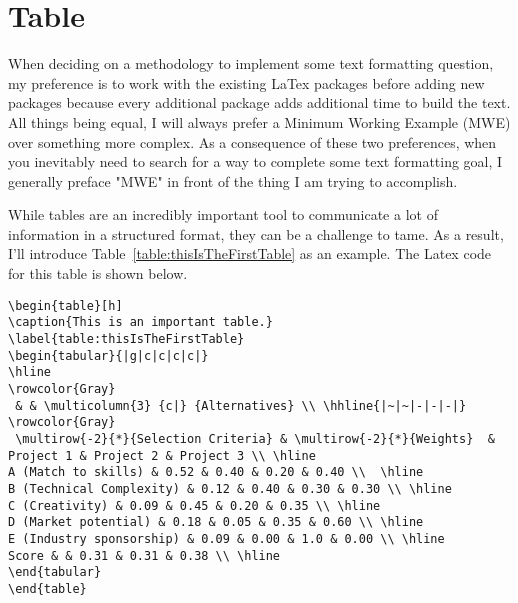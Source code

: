 \section{Table}
\label{section:the-first-section}
When deciding on a methodology to implement some text formatting question,
my preference is to work with the existing LaTex packages before adding new
packages because every additional package adds additional time to build the
text.  All things being equal, I will always prefer a Minimum Working Example 
(MWE) over something more complex.  As a consequence of these two preferences,
when you inevitably need to search for a way to complete some text formatting
goal, I generally preface "MWE" in front of the thing I am trying to accomplish.

While tables are an incredibly important tool to communicate a lot of information 
in a structured format, they can be a challenge to tame.  As a result, I'll introduce
Table~\ref{table:thisIsTheFirstTable} as an example.  The Latex code for this table
is shown below.


\begin{verbatim}
\begin{table}[h]
\caption{This is an important table.}
\label{table:thisIsTheFirstTable}
\begin{tabular}{|g|c|c|c|c|}
\hline
\rowcolor{Gray}
 & & \multicolumn{3} {c|} {Alternatives} \\ \hhline{|~|~|-|-|-|}
\rowcolor{Gray}
 \multirow{-2}{*}{Selection Criteria} & \multirow{-2}{*}{Weights}  & Project 1 & Project 2 & Project 3 \\ \hline
A (Match to skills) & 0.52 & 0.40 & 0.20 & 0.40 \\  \hline
B (Technical Complexity) & 0.12 & 0.40 & 0.30 & 0.30 \\ \hline
C (Creativity) & 0.09 & 0.45 & 0.20 & 0.35 \\ \hline
D (Market potential) & 0.18 & 0.05 & 0.35 & 0.60 \\ \hline
E (Industry sponsorship) & 0.09 & 0.00 & 1.0 & 0.00 \\ \hline
Score & & 0.31 & 0.31 & 0.38 \\ \hline
\end{tabular}
\end{table}
\end{verbatim}

